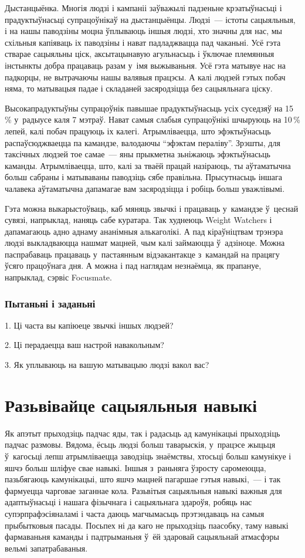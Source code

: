Дыстанцыёнка. Многія людзі і кампаніі заўважылі падзеньне крэатыўнасьці і прадуктыўнасьці супрацоўнікаў на дыстанцыёнцы. Людзі~--- істоты сацыяльныя, і на нашы паводзіны моцна ўплываюць іншыя людзі, хто значны для нас, мы схільныя капіяваць іх паводзіны і нават падладжвацца пад чаканьні. Усё гэта стварае сацыяльны ціск, аксытацынавую агульнасьць і ўключае племянныя інстынкты добра працаваць разам у~імя выжываньня. Усё гэта матывуе нас на падкорцы, не вытрачаючы нашы валявыя працэсы. А калі людзей гэтых побач няма, то матывацыя падае і складаней засяродзіцца без сацыяльнага ціску.

Высокапрадуктыўны супрацоўнік павышае прадуктыўнасьць усіх суседзяў на 15\,\% у~радыусе каля 7 мэтраў. Нават самыя слабыя супрацоўнікі шчыруюць на 10\,\% лепей, калі побач працуюць іх калегі. Атрымліваецца, што эфэктыўнасьць распаўсюджваецца па камандзе, валодаючы ``эфэктам пераліву''. Зрэшты, для таксічных людзей тое самае~--- яны прыкметна зьніжаюць эфэктыўнасьць каманды. Атрымліваецца, што, калі за тваёй працай назіраюць, ты аўтаматычна больш сабраны і матываваны паводзіць сябе правільна. Прысутнасьць іншага чалавека аўтаматычна дапамагае вам засяродзіцца і робіць больш уважлівымі.

Гэта можна выкарыстоўваць, каб мяняць звычкі і працаваць у~камандзе ў~цеснай сувязі, напрыклад, наняць сабе куратара. Так худнеюць Weight Watchers і дапамагаюць адно аднаму ананімныя алькаголікі. А пад кіраўніцтвам трэнэра людзі выкладваюцца нашмат мацней, чым калі займаюцца ў~адзіноце. Можна паспрабаваць працаваць у~пастаянным відэакантакце з~камандай на працягу ўсяго працоўнага дня. А можна і пад наглядам незнаёмца, як прапануе, напрыклад, сэрвіс Focusmate.

\subsubsection{Пытаньні і заданьні}

1. Ці часта вы капіюеце звычкі іншых людзей?

2. Ці перадаецца ваш настрой навакольным?

3. Як уплываюць на вашую матывацыю людзі вакол вас?


\section{Разьвівайце сацыяльныя навыкі}

Як апэтыт прыходзіць падчас яды, так і радасьць ад камунікацыі прыходзіць падчас размовы. Вядома, ёсьць людзі больш таварыскія, у~працэсе жыцьця ў~кагосьці лепш атрымліваецца заводзіць знаёмствы, хтосьці больш камунікуе і яшчэ больш шліфуе свае навыкі. Іншыя з~раньняга ўзросту саромеюцца, пазьбягаюць камунікацыі, што яшчэ мацней пагаршае гэтыя навыкі,~--- і так фармуецца чарговае заганнае кола. Разьвітыя сацыяльныя навыкі важныя для адаптыўнасьці і нашага фізычнага і сацыяльнага здароўя, робяць нас супэрпрафэсіяналамі і часта даюць магчымасьць прэтэндаваць на самыя прыбытковыя пасады. Посьпех ні да каго не прыходзіць паасобку, таму навыкі фармаваньня каманды і падтрыманьня ў~ёй здаровай сацыяльнай атмасфэры вельмі запатрабаваныя.

